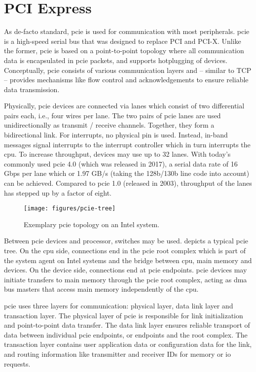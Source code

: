 \section{PCI Express}
\label{sec:pcie}

As de-facto standard, \acf{pcie} is used for communication with most
peripherals. \ac{pcie} is a high-speed serial bus that was designed to replace
PCI and PCI-X. Unlike the former, \ac{pcie} is based on a point-to-point
topology where all communication data is encapsulated in \ac{pcie} packets, and
supports hotplugging of devices. Conceptually, \ac{pcie} consists of various
communication layers and -- similar to TCP -- provides mechanisms like flow
control and acknowledgements to ensure reliable data transmission.

Physically, \ac{pcie} devices are connected via lanes which consist of two
differential pairs each, i.e., four wires per lane. The two pairs of \ac{pcie}
lanes are used unidirectionally as transmit / receive channels. Together, they
form a bidirectional link. For interrupts, no physical pin is used. Instead,
in-band messages signal interrupts to the interrupt controller which in turn
interrupts the \ac{cpu}. To increase throughput, devices may use up to 32 lanes.
With today's commonly used \ac{pcie} 4.0 (which was released in 2017), a serial
data rate of 16 Gbps per lane which or 1.97 GB/s (taking the 128b/130b line code
into account) can be achieved. Compared to \ac{pcie} 1.0 (released in 2003),
throughput of the lanes has stepped up by a factor of eight.

\begin{figure}
    \centering
    \texttt{[image: figures/pcie-tree]}
    \caption{Exemplary \acs{pcie} topology on an Intel system.}
    \label{fig:pcie-topology}
\end{figure}

Between \ac{pcie} devices and processor, switches may be used.
 depicts a typical \ac{pcie} tree. On the \ac{cpu} side,
connections end in the \ac{pcie} root complex which is part of the system agent
on Intel systems and the bridge between \ac{cpu}, main memory and devices. On
the device side, connections end at \ac{pcie} endpoints. \ac{pcie} devices may
initiate transfers to main memory through the \ac{pcie} root complex, acting as
\acs{dma} bus masters that access main memory independently of the \ac{cpu}.

\ac{pcie} uses three layers for communication: physical layer, data link layer
and transaction layer. The physical layer of \ac{pcie} is responsible for link
initialization and point-to-point data transfer. The data link layer ensures
reliable transport of data between individual \ac{pcie} endpoints, or endpoints
and the root complex. The transaction layer contains user application data or
configuration data for the link, and routing information like transmitter and
receiver IDs for memory or \ac{io} requests.


